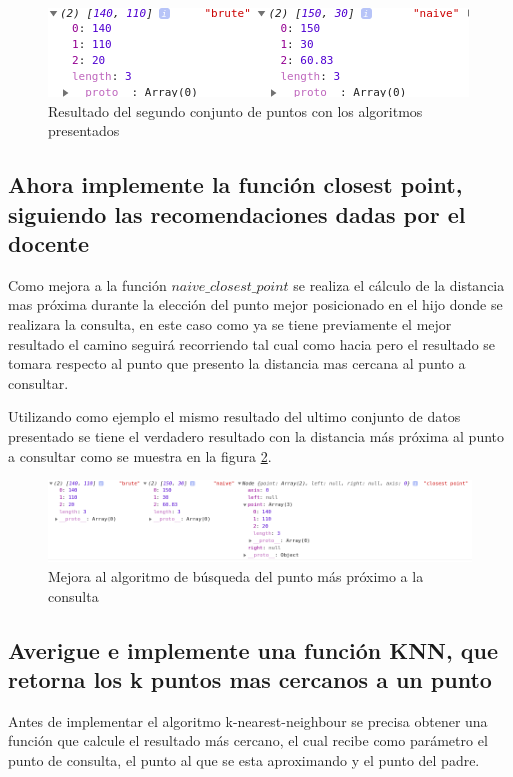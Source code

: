 \documentclass{article}
\begin{document}
    		\begin{figure}[H]
    			\centering
    			\includegraphics[scale=0.45]{img/query4_result.png}
    			\caption{Resultado del segundo conjunto de puntos con los algoritmos presentados}
    			\label{fig:query4_result}
    		\end{figure}
		
		\subsection{Ahora implemente la función closest point, siguiendo las recomendaciones dadas por el docente} 
		
		    Como mejora a la función $naive\_closest\_point$ se realiza el cálculo de la distancia mas próxima durante la elección del punto mejor posicionado en el hijo donde se realizara la consulta, en este caso como ya se tiene previamente el mejor resultado el camino seguirá recorriendo tal cual como hacia pero el resultado se tomara respecto al punto que presento la distancia mas cercana al punto a consultar. 
		
		    
		    
		    Utilizando como ejemplo el mismo resultado del ultimo conjunto de datos presentado se tiene el verdadero resultado con la distancia más próxima al punto a consultar como se muestra en la figura \ref{fig:closest1}.
		    
		    \begin{figure}[H]
    			\centering
    			\includegraphics[scale=0.45]{img/closest1.png}
    			\caption{Mejora al algoritmo de búsqueda del punto más próximo a la consulta}
    			\label{fig:closest1}
    		\end{figure}
		
		\subsection{Averigue e implemente una función KNN, que retorna los k puntos mas cercanos a un punto} 
		    Antes de implementar el algoritmo k-nearest-neighbour se precisa obtener una función que calcule el resultado más cercano, el cual recibe como parámetro el punto de consulta, el punto al que se esta aproximando y el punto del padre.
		
\end{document}
